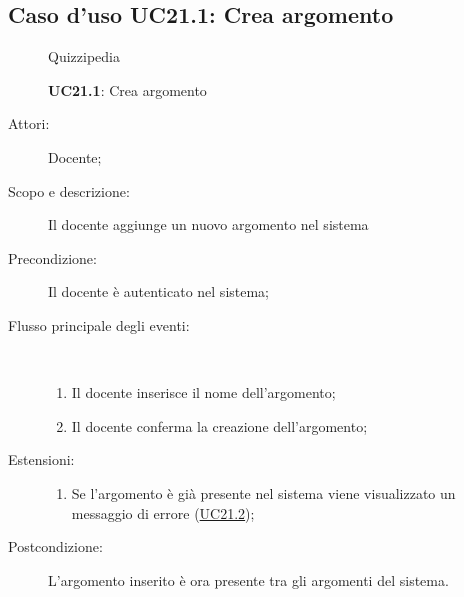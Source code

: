 \subsection{Caso d'uso UC21.1: Crea argomento}
\begin{figure}[H]
	\centering
	\begin{resizedtikzpicture}{\textwidth}
		\begin{umlsystem}[x=0, fill=lightgray!20]{Quizzipedia}
		\end{umlsystem}
	\end{resizedtikzpicture}
	\caption{\textbf{UC21.1}: Crea argomento}
	\label{UC21.1}
\end{figure}
\begin{description}
	\item[Attori:] Docente;
	\item[Scopo e descrizione:] Il docente aggiunge un nuovo argomento nel sistema
	\item[Precondizione:] Il docente è autenticato nel sistema;
	
	\item[Flusso principale degli eventi:] \ 
	\begin{enumerate}
		\item Il docente inserisce il nome dell'argomento;
		\item Il docente conferma la creazione dell'argomento;
		
	\end{enumerate}
	\item[Estensioni:]
	\begin{enumerate}
		\item Se l'argomento è già presente nel sistema viene visualizzato un messaggio di errore (\hyperlink{UC21.2}{UC21.2});
		
	\end{enumerate}
	\item[Postcondizione:] L'argomento inserito è ora presente tra gli argomenti del sistema.
\end{description}
\hypertarget{UC21.2}{}
